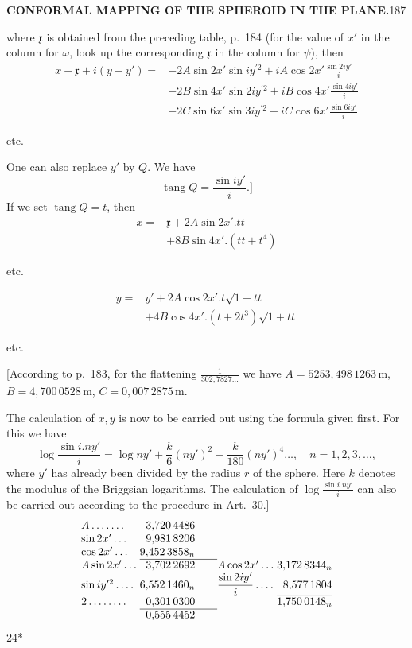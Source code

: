\par\clearpage
\noindent\null\hfill{\small\textbf{CONFORMAL MAPPING OF THE SPHEROID IN THE PLANE.}}\hfill187\par\medskip
\noindent where \(\mathfrak{x}\) is obtained from the preceding table, p.~184 (for the value of \(x'\) in the column for \(\omega\), look up the corresponding \(\mathfrak{x}\) in the column for \(\psi\)), then
\[
\begin{aligned}
x-\mathfrak{x}+i(y-y')={}&-2A\sin2x'\sin iy^{\prime 2}+iA\cos2x'\frac{\sin2iy'}{i}\\
&-2B\sin4x'\sin2iy^{\prime 2}+iB\cos4x'\frac{\sin4iy'}{i}\\
&-2C\sin6x'\sin3iy^{\prime 2}+iC\cos6x'\frac{\sin6iy'}{i}
\end{aligned}
\]
{\centering etc.\par}
One can also replace \(y'\) by \(Q\). We have
\[\operatorname{tang}Q=\frac{\sin iy'}{i}.]\]
If we set \(\operatorname{tang}Q=t\), then
\[
\begin{aligned}
x={}&\mathfrak{x}+2A\sin2x'.tt\\
&+8B\sin4x'.(tt+t^4)
\end{aligned}
\]
{\centering etc.\par}
\[
\begin{aligned}
y={}&y'+2A\cos2x'.t\sqrt{1+tt}\\
&+4B\cos4x'.(t+2t^3)\sqrt{1+tt}
\end{aligned}
\]
{\centering etc.\par}
[According to p.~183, for the flattening \(\frac1{302{,}7827\ldots}\) we have \(A=5253{,}498\,1263\,\mathrm{m}\), \(B=4{,}700\,0528\,\mathrm{m}\), \(C=0{,}007\,2875\,\mathrm{m}\).

The calculation of \(x,y\) is now to be carried out using the formula given first. For this we have
\[
\log\frac{\sin i.ny'}{i}=\log ny'+\frac{k}{6}(ny')^2-\frac{k}{180}(ny')^4\ldots,\quad n=1,2,3,\ldots,
\]
\noindent where \(y'\) has already been divided by the radius \(r\) of the sphere. Here \(k\) denotes the modulus of the Briggsian logarithms. The calculation of \(\log\frac{\sin i.ny'}{i}\) can also be carried out according to the procedure in Art.~30.]
\[
\begin{array}{@{}l@{\;}r@{\qquad}l@{\;}r@{}}
A\,.\,.\,.\,.\,.\,.\,.&3{,}720\,4486&&\\
\sin2x'\,.\,.\,.&9{,}981\,8206&&\\
\cos2x'\,.\,.\,.&9{,}452\,3858_n&&\\\cline{2-2}
A\sin2x'\,.\,.\,.&3{,}702\,2692&A\cos2x'\,.\,.\,.&3{,}172\,8344_n\\
\sin iy^{\prime 2}\,.\,.\,.\,.&6{,}552\,1460_n&\dfrac{\sin2iy'}{i}\,.\,.\,.\,.&8{,}577\,1804\\\cline{4-4}
2\,.\,.\,.\,.\,.\,.\,.\,.&0{,}301\,0300&&1{,}750\,0148_n\\\cline{2-2}
&0{,}555\,4452&&
\end{array}
\]
\noindent\null\hfill{\small24*}\hspace*{.12\linewidth}\par

